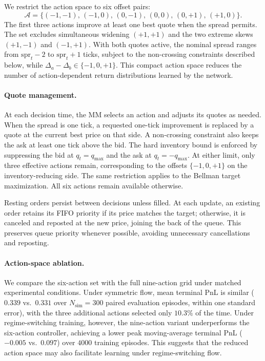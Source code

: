 \documentclass[11pt,a4paper]{article}
\begin{document}
We restrict the action space to six offset pairs:
\begin{equation}
    \mathcal{A}=\bigl\{
    (-1,-1),\,(-1,0),\,(0,-1),\,
    (0,0),\,(0,+1),\,(+1,0)
    \bigr\}.
\end{equation}
The first three actions improve at least one best quote when
the spread permits. The set excludes simultaneous widening
$(+1,+1)$ and the two extreme skews $(+1,-1)$ and $(-1,+1)$.
With both quotes active, the nominal spread ranges from
$\mathrm{spr}_t-2$ to $\mathrm{spr}_t+1$ ticks, subject to
the non-crossing constraints described below, while
$\Delta_a-\Delta_b\in\{-1,0,+1\}$.
This compact action space reduces the number of
action-dependent return distributions learned by the network.

\paragraph{Quote management.}
At each decision time, the MM selects an action and adjusts
its quotes as needed. When the spread is one tick, a requested
one-tick improvement is replaced by a quote at the current
best price on that side. A non-crossing constraint also
keeps the ask at least one tick above the bid.
The hard inventory bound is enforced by suppressing the bid
at $q_t=q_{\max}$ and the ask at $q_t=-q_{\max}$.
At either limit, only three effective actions remain,
corresponding to the offsets $\{-1,0,+1\}$ on the
inventory-reducing side. The same restriction applies
to the Bellman target maximization. All six actions
remain available otherwise.

Resting orders persist between decisions unless filled.
At each update, an existing order retains its FIFO priority
if its price matches the target; otherwise, it is canceled
and reposted at the new price, joining the back of the queue.
This preserves queue priority whenever possible, avoiding
unnecessary cancellations and reposting.


\paragraph{Action-space ablation.}
We compare the six-action set with the full nine-action grid
under matched experimental conditions. Under symmetric flow,
mean terminal PnL is similar ($0.339$ vs.\ $0.331$ over
$N_{\mathrm{sim}}=300$ paired evaluation episodes, within
one standard error), with the three additional actions
selected only $10.3\%$ of the time.
Under regime-switching training, however, the nine-action
variant underperforms the six-action controller, achieving
a lower peak moving-average terminal PnL
($-0.005$ vs.\ $0.097$) over $4000$ training episodes.
This suggests that the reduced action space may also
facilitate learning under regime-switching flow.
\end{document}
